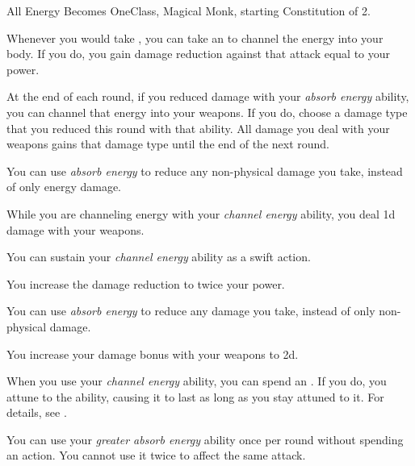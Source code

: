     \begin{feat}{All Energy Becomes One}{Class, Magical}
        \featpre Monk, starting Constitution of 2.

         Whenever you would take , you can take an  to channel the energy into your body.
        If you do, you gain damage reduction against that attack equal to your \ki power.

         At the end of each round, if you reduced damage with your \textit{absorb energy} ability, you can channel that energy into your weapons.
        If you do, choose a damage type that you reduced this round with that ability.
        All damage you deal with your weapons gains that damage type until the end of the next round.

         You can use \textit{absorb energy} to reduce any non-physical damage you take, instead of only energy damage.

         While you are channeling energy with your \textit{channel energy} ability, you deal \plus1d damage with your weapons.

         You can sustain your \textit{channel energy} ability as a swift action.

         You increase the damage reduction to twice your \ki power.

         You can use \textit{absorb energy} to reduce any damage you take, instead of only non-physical damage.

         You increase your damage bonus with your weapons to \plus2d.

         When you use your \textit{channel energy} ability, you can spend an .
        If you do, you attune to the ability, causing it to last as long as you stay attuned to it.
        For details, see .

         You can use your \textit{greater absorb energy} ability once per round without spending an action.
        You cannot use it twice to affect the same attack.
    \end{feat}

